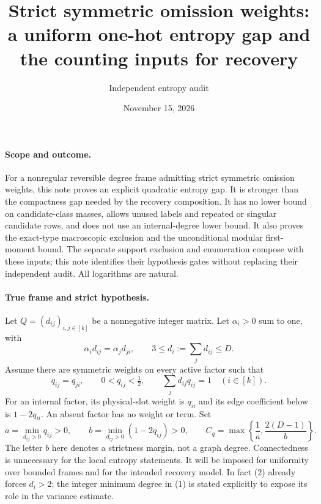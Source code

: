 \documentclass[11pt]{article}
\title{Strict symmetric omission weights:\\a uniform one-hot entropy gap and the counting inputs for recovery}
\author{Independent entropy audit}
\date{November 15, 2026}
\begin{document}
\maketitle

\paragraph{Scope and outcome.}
For a nonregular reversible degree frame admitting strict symmetric
omission weights, this note proves an explicit quadratic entropy gap.
It is stronger than the compactness gap needed by the recovery
composition. It has no lower bound on candidate-class masses, allows
unused labels and repeated or singular candidate rows, and does not
use an internal-degree lower bound. It also proves the exact-type
macroscopic exclusion and the unconditional modular first-moment bound.
The separate support exclusion and enumeration compose with these
inputs; this note identifies their hypothesis gates without replacing
their independent audit. All logarithms are natural.

\paragraph{True frame and strict hypothesis.}
Let $Q=(d_{ij})_{i,j\in[k]}$ be a nonnegative integer matrix. Let
$\alpha_i>0$ sum to one, with
\[
 \alpha_i d_{ij}=\alpha_jd_{ji},\qquad
 3\leq d_i:=\sum_jd_{ij}\leq D.                    \tag{1}
\]
Assume there are symmetric weights on every active factor such that
\[
 q_{ij}=q_{ji},\qquad 0<q_{ij}<\tfrac12,
 \qquad \sum_jd_{ij}q_{ij}=1\quad(i\in[k]).         \tag{2}
\]
For an internal factor, its physical-slot weight is $q_{ii}$ and
its edge coefficient below is $1-2q_{ii}$. An absent factor has no
weight or term. Set
\[
 a=\min_{d_{ij}>0}q_{ij}>0,\qquad
 b=\min_{d_{ij}>0}(1-2q_{ij})>0,
 \qquad C_q=\max\left\{\frac1a,\frac{2(D-1)}b\right\}.
                                                               \tag{3}
\]
The letter $b$ here denotes a strictness margin, not a graph degree.
Connectedness is unnecessary for the local entropy statements.
It will be imposed for uniformity over bounded frames and for the
intended recovery model. In fact (2) already forces $d_i>2$;
the integer minimum degree in (1) is stated explicitly to expose its
role in the variance estimate.
\end{document}

